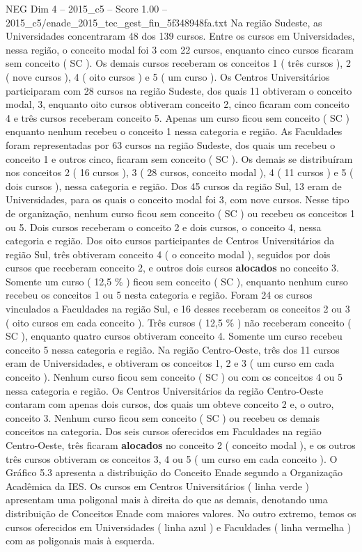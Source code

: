 \begin{textsample}{NEG Dim 4 – 2015\_c5 – Score 1.00 – 2015\_c5/enade\_2015\_tec\_gest\_fin\_5f348948fa.txt}
Na região Sudeste, as Universidades concentraram 48 dos 139 cursos.
Entre os cursos em Universidades, nessa região, o conceito modal foi 3 com 22 cursos, enquanto cinco cursos ficaram sem conceito ( SC ).
Os demais cursos receberam os conceitos 1 ( três cursos ), 2 ( nove cursos ), 4 ( oito cursos ) e 5 ( um curso ).
Os Centros Universitários participaram com 28 cursos na região Sudeste, dos quais 11 obtiveram o conceito modal, 3, enquanto oito cursos obtiveram conceito 2, cinco ficaram com conceito 4 e três cursos receberam conceito 5.
Apenas um curso ficou sem conceito ( SC ) enquanto nenhum recebeu o conceito 1 nessa categoria e região.
As Faculdades foram representadas por 63 cursos na região Sudeste, dos quais um recebeu o conceito 1 e outros cinco, ficaram sem conceito ( SC ).
Os demais se distribuíram nos conceitos 2 ( 16 cursos ), 3 ( 28 cursos, conceito modal ), 4 ( 11 cursos ) e 5 ( dois cursos ), nessa categoria e região.
Dos 45 cursos da região Sul, 13 eram de Universidades, para os quais o conceito modal foi 3, com nove cursos.
Nesse tipo de organização, nenhum curso ficou sem conceito ( SC ) ou recebeu os conceitos 1 ou 5.
Dois cursos receberam o conceito 2 e dois cursos, o conceito 4, nessa categoria e região.
Dos oito cursos participantes de Centros Universitários da região Sul, três obtiveram conceito 4 ( o conceito modal ), seguidos por dois cursos que receberam conceito 2, e outros dois cursos \textbf{alocados} no conceito 3.
Somente um curso ( 12,5 \% ) ficou sem conceito ( SC ), enquanto nenhum curso recebeu os conceitos 1 ou 5 nesta categoria e região.
Foram 24 os cursos vinculados a Faculdades na região Sul, e 16 desses receberam os conceitos 2 ou 3 ( oito cursos em cada conceito ).
Três cursos ( 12,5 \% ) não receberam conceito ( SC ), enquanto quatro cursos obtiveram conceito 4.
Somente um curso recebeu conceito 5 nessa categoria e região.
Na região Centro-Oeste, três dos 11 cursos eram de Universidades, e obtiveram os conceitos 1, 2 e 3 ( um curso em cada conceito ).
Nenhum curso ficou sem conceito ( SC ) ou com os conceitos 4 ou 5 nessa categoria e região.
Os Centros Universitários da região Centro-Oeste contaram com apenas dois cursos, dos quais um obteve conceito 2 e, o outro, conceito 3.
Nenhum curso ficou sem conceito ( SC ) ou recebeu os demais conceitos na categoria.
Dos seis cursos oferecidos em Faculdades na região Centro-Oeste, três ficaram \textbf{alocados} no conceito 2 ( conceito modal ), e os outros três cursos obtiveram os conceitos 3, 4 ou 5 ( um curso em cada conceito ).
O Gráfico 5.3 apresenta a distribuição do Conceito Enade segundo a Organização Acadêmica da IES.
Os cursos em Centros Universitários ( linha verde ) apresentam uma poligonal mais à direita do que as demais, denotando uma distribuição de Conceitos Enade com maiores valores.
No outro extremo, temos os cursos oferecidos em Universidades ( linha azul ) e Faculdades ( linha vermelha ) com as poligonais mais à esquerda.

\end{textsample}
